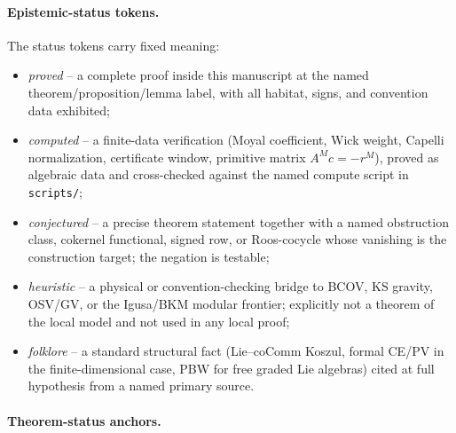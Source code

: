 \medskip
\paragraph{Epistemic-status tokens.}
The status tokens carry fixed meaning:
\begin{itemize}
\item \emph{proved} -- a complete proof inside this manuscript at the
named theorem/proposition/lemma label, with all habitat, signs, and
convention data exhibited;
\item \emph{computed} -- a finite-data verification (Moyal coefficient,
Wick weight, Capelli normalization, certificate window, primitive
matrix \(A^Mc=-r^M\)), proved as algebraic data and cross-checked
against the named compute script in \texttt{scripts/};
\item \emph{conjectured} -- a precise theorem statement together with
a named obstruction class, cokernel functional, signed row, or
Roos-cocycle whose vanishing is the construction target; the negation
is testable;
\item \emph{heuristic} -- a physical or convention-checking bridge to
BCOV, KS gravity, OSV/GV, or the Igusa/BKM modular frontier; explicitly
not a theorem of the local model and not used in any local proof;
\item \emph{folklore} -- a standard structural fact (Lie--coComm Koszul,
formal CE/PV in the finite-dimensional case, PBW for free graded Lie
algebras) cited at full hypothesis from a named primary source.
\end{itemize}

\paragraph{Theorem-status anchors.}


